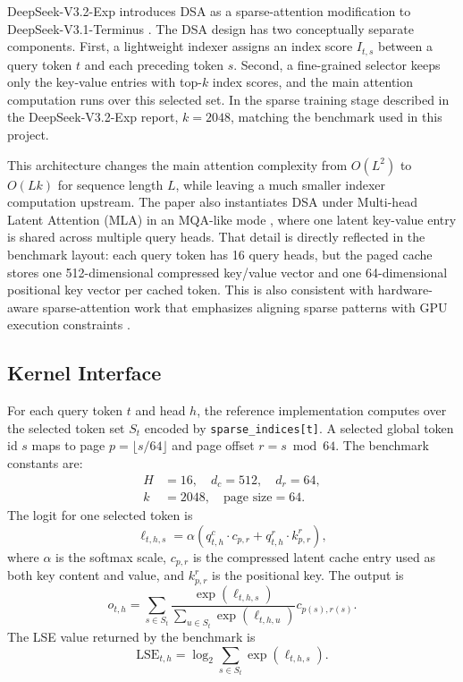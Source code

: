 \documentclass{article}
\begin{document}
DeepSeek-V3.2-Exp introduces DSA as a sparse-attention modification to
DeepSeek-V3.1-Terminus \cite{deepseekv32}. The DSA design has two conceptually
separate components. First, a lightweight indexer assigns an index score $I_{t,s}$
between a query token $t$ and each preceding token $s$. Second, a fine-grained selector
keeps only the key-value entries with top-$k$ index scores, and the main attention
computation runs over this selected set. In the sparse training stage described in the
DeepSeek-V3.2-Exp report, $k=2048$, matching the benchmark used in this project.

This architecture changes the main attention complexity from $O(L^2)$ to $O(Lk)$ for
sequence length $L$, while leaving a much smaller indexer computation upstream. The
paper also instantiates DSA under Multi-head Latent Attention (MLA) \cite{deepseekv2}
in an MQA-like mode \cite{shazeer2019}, where one latent key-value entry is shared
across multiple query heads. That detail is directly reflected in the benchmark layout:
each query token has 16 query heads, but the paged cache stores one 512-dimensional
compressed key/value vector and one 64-dimensional positional key vector per cached
token. This is also consistent with hardware-aware sparse-attention work that emphasizes
aligning sparse patterns with GPU execution constraints \cite{yuan2025nsa}.

\subsection{Kernel Interface}

For each query token $t$ and head $h$, the reference implementation computes over
the selected token set $S_t$ encoded by \texttt{sparse\_indices[t]}. A selected global
token id $s$ maps to page $p=\lfloor s/64\rfloor$ and page offset $r=s\bmod 64$.
The benchmark constants are:
\[
\begin{aligned}
H &= 16,\quad d_c = 512,\quad d_r = 64, \\
k &= 2048,\quad \text{page size} = 64.
\end{aligned}
\]
The logit for one selected token is
\[
\ell_{t,h,s} =
\alpha\left(
q^c_{t,h}\cdot c_{p,r} + q^r_{t,h}\cdot k^r_{p,r}
\right),
\]
where $\alpha$ is the softmax scale, $c_{p,r}$ is the compressed latent cache entry
used as both key content and value, and $k^r_{p,r}$ is the positional key. The output is
\[
o_{t,h}=\sum_{s\in S_t}
\frac{\exp(\ell_{t,h,s})}{\sum_{u\in S_t}\exp(\ell_{t,h,u})}c_{p(s),r(s)}.
\]
The LSE value returned by the benchmark is
\[
\mathrm{LSE}_{t,h}=\log_2\sum_{s\in S_t}\exp(\ell_{t,h,s}).
\]
\end{document}
